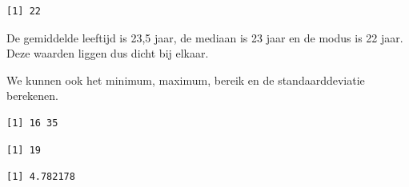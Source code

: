 \documentclass[
  letterpaper,
  DIV=11,
  numbers=noendperiod]{scrreprt}
\newenvironment{Shaded}{\begin{snugshade}}{\end{snugshade}}
\newcommand{\CommentTok}[1]{\textcolor[rgb]{0.37,0.37,0.37}{#1}}
\newcommand{\FunctionTok}[1]{\textcolor[rgb]{0.28,0.35,0.67}{#1}}
\newcommand{\NormalTok}[1]{\textcolor[rgb]{0.00,0.23,0.31}{#1}}
\newcommand{\SpecialCharTok}[1]{\textcolor[rgb]{0.37,0.37,0.37}{#1}}
\begin{document}
\begin{Shaded}
\end{Shaded}

\begin{verbatim}
[1] 22
\end{verbatim}

De gemiddelde leeftijd is 23,5 jaar, de mediaan is 23 jaar en de modus
is 22 jaar. Deze waarden liggen dus dicht bij elkaar.

We kunnen ook het minimum, maximum, bereik en de standaarddeviatie
berekenen.

\begin{Shaded}
\end{Shaded}

\begin{verbatim}
[1] 16 35
\end{verbatim}

\begin{Shaded}
\end{Shaded}

\begin{verbatim}
[1] 19
\end{verbatim}

\begin{Shaded}
\end{Shaded}

\begin{verbatim}
[1] 4.782178
\end{verbatim}
\end{document}

